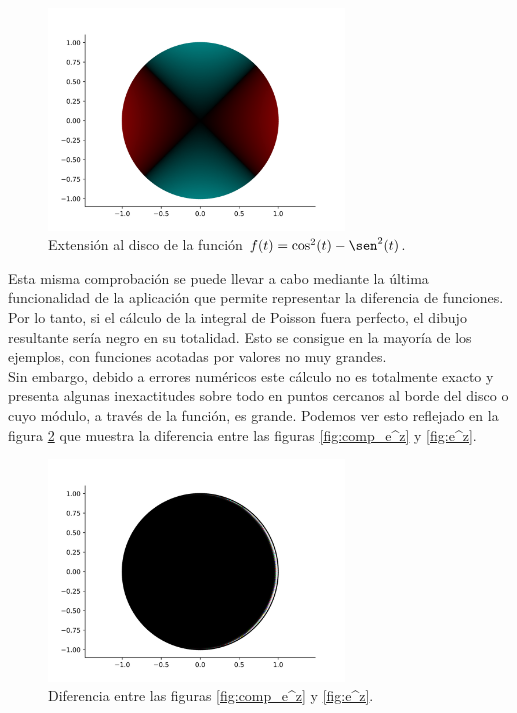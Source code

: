 \begin{figure}[!htbp]
    \centering
    \includegraphics[width=0.7\textwidth]{../Aplicacion/cos^2(t)-sen^2(t).png}
    \caption{Extensión al disco de la función $f(t) = \cos^2(t) - \sen^2(t)$.}
    \label{fig:comparacion4}
\end{figure}

Esta misma comprobación se puede llevar a cabo mediante la última funcionalidad de la aplicación que permite representar la diferencia de funciones. Por lo tanto, si el cálculo de la integral de Poisson fuera perfecto, el dibujo resultante sería negro en su totalidad. Esto se consigue en la mayoría de los ejemplos, con funciones acotadas por valores no muy grandes. \\

Sin embargo, debido a errores numéricos este cálculo no es totalmente exacto y presenta algunas inexactitudes sobre todo en puntos cercanos al borde del disco o cuyo módulo, a través de la función, es grande. Podemos ver esto reflejado en la figura \ref{fig:diferencia} que muestra la diferencia entre las figuras \ref{fig:comp_e^z} y \ref{fig:e^z}. \\


\begin{figure}[!htbp]
    \centering
    \includegraphics[width=0.7\textwidth]{../Aplicacion/diff_e^z.png}
    \caption{Diferencia entre las figuras \ref{fig:comp_e^z} y \ref{fig:e^z}.}
    \label{fig:diferencia}
\end{figure}

